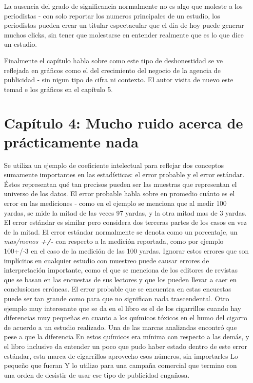 \documentclass[letterpaper, 11pt]{article}
\begin{document}
La ausencia del grado de significancia normalmente no es algo que moleste a los periodistas - con solo reportar los numeros principales de un estudio, los periodistas pueden crear un titular espectacular que el dia de hoy puede generar muchos clicks, sin tener que molestarse en entender realmente que es lo que dice un estudio. 

Finalmente el capítulo habla sobre como este tipo de deshonestidad se ve reflejada en gráficos como el del crecimiento del negocio de la agencia de publicidad - sin nigun tipo de cifra ni contexto. El autor visita de nuevo este temad e los gráficos en el capítulo 5.


\section*{Capítulo 4: Mucho ruido acerca de prácticamente nada}

Se utiliza un ejemplo de coeficiente intelectual para reflejar dos conceptos sumamente importantes en las estadísticas: el error probable y el error estándar. Éstos representan qué tan precisos pueden ser las muestras que representan el universo de los datos. El error probable habla sobre en promedio cuánto es el error en las mediciones - como en el ejemplo se menciona que al medir 100 yardas, se mide la mitad de las veces 97 yardas, y la otra mitad mas de 3 yardas. El error estándar es similar pero considera dos terceras partes de los casos en vez de la mitad.
El error estándar normalmente se denota como un porcentaje, un \textit{mas/menos \textbf{+/-}} con respecto a la medición reportada, como por ejemplo 100+/-3 en el caso de la medición de las 100 yardas.
Ignorar estos errores que son implícitos en cualquier estudio con muestreo puede causar errores de interpretación importante, como el que se menciona de los editores de revistas que se basan en las encuestas de sus lectores y que los pueden llevar a caer en conclusiones erróneas. El error probable que se encuentra en estas encuestas puede ser tan grande como para que no significan nada trascendental.
Otro ejemplo muy interesante que se da en el libro es el de los cigarrillos cuando hay diferencias muy pequeñas en cuanto a los químicos tóxicos en el humo del cigarro de acuerdo a un estudio realizado. Una de las marcas analizadas encontró que pese a que la diferencia En estos químicos era mínima con respecto a las demás, y el libro inclusive da entender un poco que pudo haber estado dentro de este error estándar, esta marca de cigarrillos aprovecho esos números, sin importarles Lo pequeño que fueran Y lo utilizo para una campaña comercial que termino con una orden de desistir de usar ese tipo de publicidad engañosa.
\end{document}
